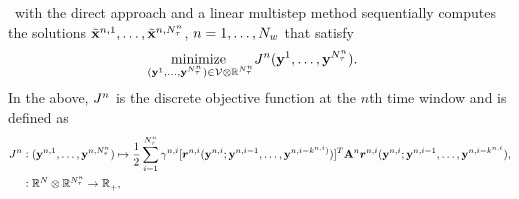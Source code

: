 \methodAcronym\ with the direct approach and a linear multistep method sequentially computes the solutions
$\tilde{\mathbf{x}}^{n,1},\ldots,\tilde{\mathbf{x}}^{n,N_{\tau}^{n}}$,
$n=1,\ldots,N_w$ that satisfy
\begin{align*}
	&\underset{(\mathbf{y}^{1},\ldots,\mathbf{y}^{N_{\tau}^{n}}) \in \mathcal{V }\otimes \mathbb{R}^{N_{\tau}^{n}}}{\text{minimize } }
J_{}^{n} (\mathbf{y}^{1},\ldots,\mathbf{y}^{N_{\tau}^{n}}). 
\end{align*}
In the above, $J_{}^{n}$ is the discrete objective function at the $n$th time window and is defined as
\begin{equation*}%
\begin{split} 
\objectiveArgLMS{n} &\vcentcolon (\stateyDiscreteArgnt{n,1},\ldots,\stateyDiscreteArgnt{n,\nstepsArg{n}}) \mapsto
\frac{1}{2} \sum_{i=1}^{\nstepsArg{n}} \quadWeightsLMSScalarArg{n}{i} [\residLMSWArg{n}{i}(\stateyDiscreteArgnt{n,i};\stateyDiscreteArgnt{n,i-1},\ldots, \stateyDiscreteArgnt{n,i-\lmsWidthArg{n}{i})})]^T  \stweightingMatArgt{n}{\timeWindowArg{n}{i}} \residLMSWArg{n}{i}(\stateyDiscreteArgnt{n,i};\stateyDiscreteArgnt{n,i-1},\ldots, \stateyDiscreteArgnt{n,i-\lmsWidthArg{n}{i}}), \\
&\vcentcolon \RR{\fomdim} \otimes \RR{\nstepsArg{n}} \rightarrow
\RR{}_+, 
\end{split}
\end{equation*}

